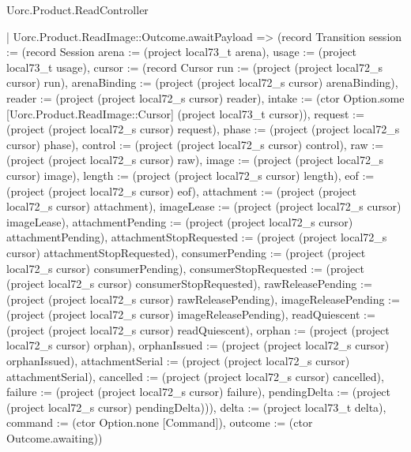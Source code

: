 \begin{lexlean}{Uorc.Product.ReadController}
\begin{semanticmodule}
{    | Uorc.Product.ReadImage::Outcome.awaitPayload => (record Transition {session := (record Session {arena := (project local73_t arena), usage := (project local73_t usage), cursor := (record Cursor {run := (project (project local72_s cursor) run), arenaBinding := (project (project local72_s cursor) arenaBinding), reader := (project (project local72_s cursor) reader), intake := (ctor Option.some [Uorc.Product.ReadImage::Cursor] (project local73_t cursor)), request := (project (project local72_s cursor) request), phase := (project (project local72_s cursor) phase), control := (project (project local72_s cursor) control), raw := (project (project local72_s cursor) raw), image := (project (project local72_s cursor) image), length := (project (project local72_s cursor) length), eof := (project (project local72_s cursor) eof), attachment := (project (project local72_s cursor) attachment), imageLease := (project (project local72_s cursor) imageLease), attachmentPending := (project (project local72_s cursor) attachmentPending), attachmentStopRequested := (project (project local72_s cursor) attachmentStopRequested), consumerPending := (project (project local72_s cursor) consumerPending), consumerStopRequested := (project (project local72_s cursor) consumerStopRequested), rawReleasePending := (project (project local72_s cursor) rawReleasePending), imageReleasePending := (project (project local72_s cursor) imageReleasePending), readQuiescent := (project (project local72_s cursor) readQuiescent), orphan := (project (project local72_s cursor) orphan), orphanIssued := (project (project local72_s cursor) orphanIssued), attachmentSerial := (project (project local72_s cursor) attachmentSerial), cancelled := (project (project local72_s cursor) cancelled), failure := (project (project local72_s cursor) failure), pendingDelta := (project (project local72_s cursor) pendingDelta)})}), delta := (project local73_t delta), command := (ctor Option.none [Command]), outcome := (ctor Outcome.awaiting)})
}
\end{semanticmodule}
\end{lexlean}
